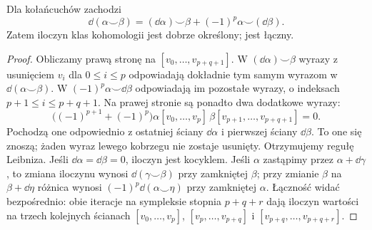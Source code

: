 \begin{stwierdzenie}
\label{prop:kubek-leibniz-16}
Dla kołańcuchów zachodzi
\[
 \dd(\alpha\smile\beta)
 =(\dd\alpha)\smile\beta
       +(-1)^p\alpha\smile(\dd\beta).
\]
Zatem iloczyn klas kohomologii jest
dobrze określony; jest łączny.
\end{stwierdzenie}
\begin{proof}
Obliczamy prawą stronę na $[v_0,\ldots,v_{p+q+1}]$.
W $(\dd\alpha)\smile\beta$ wyrazy z usunięciem
$v_i$ dla $0\leq i\leq p$ odpowiadają dokładnie
tym samym wyrazom w $\dd(\alpha\smile\beta)$.
W $(-1)^p\alpha\smile\dd\beta$ odpowiadają im
pozostałe wyrazy, o indeksach $p+1\leq i\leq p+q+1$.
Na prawej stronie są ponadto dwa dodatkowe wyrazy:
\[
 \bigl((-1)^{p+1}+(-1)^p\bigr)
 \alpha[v_0,\ldots,v_p]\,
 \beta[v_{p+1},\ldots,v_{p+q+1}]=0.
\]
Pochodzą one odpowiednio z ostatniej ściany
$\dd\alpha$ i pierwszej ściany $\dd\beta$.
To one się znoszą; żaden wyraz lewego kobrzegu
nie zostaje usunięty. Otrzymujemy regułę Leibniza.
Jeśli $\dd\alpha=\dd\beta=0$,
iloczyn jest kocyklem.
Jeśli $\alpha$ zastąpimy przez
$\alpha+\dd\gamma$, to zmiana
iloczynu wynosi
$\dd(\gamma\smile\beta)$
przy zamkniętej $\beta$;
przy zmianie $\beta$ na $\beta+\dd\eta$ różnica
wynosi $(-1)^p\dd(\alpha\smile\eta)$ przy zamkniętej $\alpha$.
Łączność widać bezpośrednio:
obie iteracje na sympleksie
stopnia $p+q+r$ dają iloczyn
wartości na trzech kolejnych
ścianach
$[v_0,\ldots,v_p]$,
$[v_p,\ldots,v_{p+q}]$ i
$[v_{p+q},\ldots,v_{p+q+r}]$.
\end{proof}

